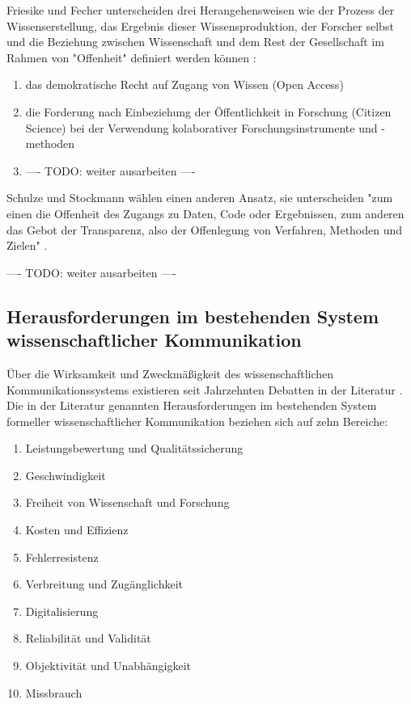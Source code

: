 Friesike und Fecher unterscheiden drei Herangehensweisen wie der Prozess der Wissenserstellung, das Ergebnis dieser Wissensproduktion, der Forscher selbst und die Beziehung zwischen Wissenschaft und dem Rest der Gesellschaft im Rahmen von "Offenheit" definiert werden können \cite{cite:9}:
\begin{enumerate}
\item das demokratische Recht auf Zugang von Wissen (Open Access)
\item die Forderung nach Einbeziehung der Öffentlichkeit in Forschung (Citizen Science) bei der Verwendung kolaborativer Forschungsinstrumente und -methoden \cite{grand_2012_open}
\item ---- TODO: weiter ausarbeiten ----
\end{enumerate}

Schulze und Stockmann wählen einen anderen Ansatz, sie unterscheiden "zum einen die Offenheit des Zugangs zu Daten, Code oder Ergebnissen, zum anderen das Gebot der Transparenz, also der Offenlegung von Verfahren, Methoden und Zielen" \cite{schulze_2013_open}.

---- TODO: weiter ausarbeiten ----

\subsection{Herausforderungen im bestehenden System wissenschaftlicher Kommunikation}

Über die Wirksamkeit und Zweckmäßigkeit des wissenschaftlichen Kommunikationssystems existieren seit Jahrzehnten Debatten in der Literatur \cite{suchen}. Die in der Literatur genannten Herausforderungen im bestehenden System formeller wissenschaftlicher Kommunikation beziehen sich auf zehn Bereiche:
\begin{enumerate}
\item Leistungsbewertung und Qualitätssicherung
\item Geschwindigkeit
\item Freiheit von Wissenschaft und Forschung
\item Kosten und Effizienz
\item Fehlerresistenz
\item Verbreitung und Zugänglichkeit
\item Digitalisierung
\item Reliabilität und Validität
\item Objektivität und Unabhängigkeit
\item Missbrauch
\end{enumerate}

